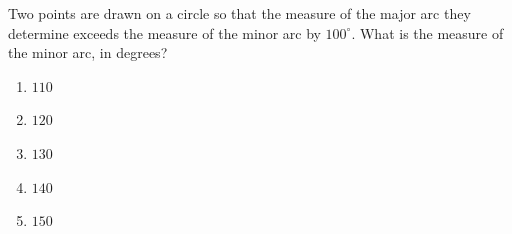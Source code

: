 Two points are drawn on a circle so that the measure of the major arc they determine exceeds the measure of the minor arc by $100^\circ$. What is the measure of the minor arc, in degrees?
\begin{enumerate}
\item[(A)] $110$
\item[(B)] $120$
\item[(C)] $130$
\item[(D)] $140$
\item[(E)] $150$
\end{enumerate}
